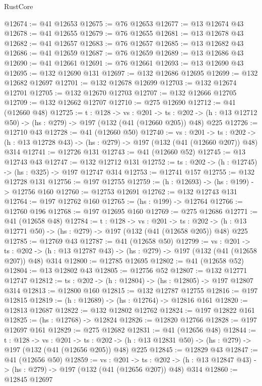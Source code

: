 \begin{lexlean}{RustCore}
\begin{coremodule}
@12674 := @41 @12653
@12675 := @76 @12653
@12677 := @13 @12674 @43
@12678 := @41 @12655
@12679 := @76 @12655
@12681 := @13 @12678 @43
@12682 := @41 @12657
@12683 := @76 @12657
@12685 := @13 @12682 @43
@12686 := @41 @12659
@12687 := @76 @12659
@12689 := @13 @12686 @43
@12690 := @41 @12661
@12691 := @76 @12661
@12693 := @13 @12690 @43
@12695 := @132 @12690 @131
@12697 := @132 @12686 @12695
@12699 := @132 @12682 @12697
@12701 := @132 @12678 @12699
@12703 := @132 @12674 @12701
@12705 := @132 @12670 @12703
@12707 := @132 @12666 @12705
@12709 := @132 @12662 @12707
@12710 := @275 @12690
@12712 := @41 (@12660 @48)
@12725 := {t : @128} ->
  {vs : @201} ->
  {ts : @202} -> (h : @13 @12712 @50) -> (hs : @279) -> @197 (@132 (@41 (@12660 @205)) @48) @225
@12726 := @12710 @43
@12728 := @41 (@12660 @50)
@12740 := {vs : @201} ->
  {ts : @202} -> (h : @13 @12728 @43) -> (hs : @279) -> @197 (@132 (@41 (@12660 @207)) @48) @314
@12741 := @12726 @131
@12743 := @41 (@12660 @52)
@12745 := @13 @12743 @43
@12747 := @132 @12712 @131
@12752 := {ts : @202} -> (h : @12745) -> (hs : @325) -> @197 @12747 @314
@12753 := @12741 @157
@12755 := @132 @12728 @131
@12756 := @197 @12755
@12759 := (h : @12693) -> (hs : @199) -> @12756 @160
@12760 := @12753 @12691
@12762 := @132 @12743 @131
@12764 := @197 @12762 @160
@12765 := (hs : @199) -> @12764
@12766 := @12760 @196
@12768 := @197 @12695 @160
@12769 := @275 @12686
@12771 := @41 (@12658 @48)
@12784 := {t : @128} ->
  {vs : @201} ->
  {ts : @202} -> (h : @13 @12771 @50) -> (hs : @279) -> @197 (@132 (@41 (@12658 @205)) @48) @225
@12785 := @12769 @43
@12787 := @41 (@12658 @50)
@12799 := {vs : @201} ->
  {ts : @202} -> (h : @13 @12787 @43) -> (hs : @279) -> @197 (@132 (@41 (@12658 @207)) @48) @314
@12800 := @12785 @12695
@12802 := @41 (@12658 @52)
@12804 := @13 @12802 @43
@12805 := @12756 @52
@12807 := @132 @12771 @12747
@12812 := {ts : @202} -> (h : @12804) -> (hs : @12805) -> @197 @12807 @314
@12813 := @12800 @160
@12815 := @132 @12787 @12755
@12816 := @197 @12815
@12819 := (h : @12689) -> (hs : @12764) -> @12816 @161
@12820 := @12813 @12687
@12822 := @132 @12802 @12762
@12824 := @197 @12822 @161
@12825 := (hs : @12768) -> @12824
@12826 := @12820 @12766
@12828 := @197 @12697 @161
@12829 := @275 @12682
@12831 := @41 (@12656 @48)
@12844 := {t : @128} ->
  {vs : @201} ->
  {ts : @202} -> (h : @13 @12831 @50) -> (hs : @279) -> @197 (@132 (@41 (@12656 @205)) @48) @225
@12845 := @12829 @43
@12847 := @41 (@12656 @50)
@12859 := {vs : @201} ->
  {ts : @202} -> (h : @13 @12847 @43) -> (hs : @279) -> @197 (@132 (@41 (@12656 @207)) @48) @314
@12860 := @12845 @12697

\end{coremodule}
\end{lexlean}
